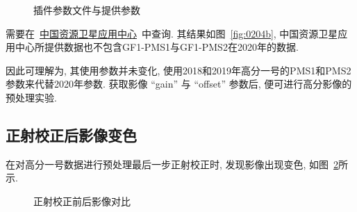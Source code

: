 \begin{figure}[htbp]
    \centering
    \qquad
    \caption{插件参数文件与提供参数}
    \label{fig:0204}
\end{figure}

需要在~\href{http://www.cresda.com/CN/Downloads/dbcs/index.shtml}{中国资源卫星应用中心}~中查询. 其结果如图~\ref{fig:0204b}, 中国资源卫星应用中心所提供数据也不包含GF1-PMS1与GF1-PMS2在2020年的数据.

因此可理解为, 其使用参数并未变化, 使用2018和2019年高分一号的PMS1和PMS2参数来代替2020年参数. 获取影像 ``gain'' 与 ``offset'' 参数后, 便可进行高分影像的预处理实验. 

\subsection{正射校正后影像变色}
在对高分一号数据进行预处理最后一步正射校正时, 发现影像出现变色, 如图~\ref{fig:0205}所示. 

\begin{figure}[htbp]
    \centering
    \qquad
    \caption{正射校正前后影像对比}
    \label{fig:0205}
\end{figure}

